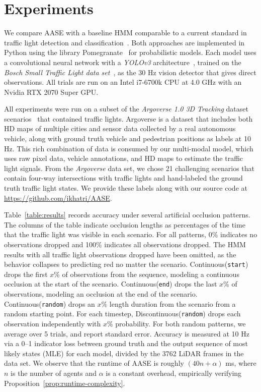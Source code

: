 \documentclass[letterpaper,10pt,conference]{ieeeconf}
\begin{document}
\section{Experiments}

We compare AASE with a baseline HMM comparable to a current standard in traffic light detection and classification~\cite{gomez2014traffic}. Both approaches are implemented in Python using the library Pomegranate~\cite{schreiber2017pomegranate} for probabilistic models. Each model uses a convolutional neural network with a \emph{YOLOv3} architecture~\cite{yolov3}, trained on the \emph{Bosch Small Traffic Light data set}~\cite{behrendt2017deep}, as the 30 Hz vision detector that gives direct observations.  All trials are run on an Intel i7-6700k CPU at 4.0 GHz with an Nvidia RTX 2070 Super GPU. 

All experiments were run on a subset of the \emph{Argoverse 1.0 3D Tracking} dataset scenarios~\cite{chang2019tracking} that contained traffic lights. Argoverse is a dataset that includes both HD maps of multiple cities and sensor data collected by a real autonomous vehicle, along with ground truth vehicle and pedestrian positions as labels at 10 Hz. This rich combination of data is consumed by our multi-modal model, which uses raw pixel data, vehicle annotations, and HD maps to estimate the traffic light signals. From the \emph{Argoverse} data set, we chose 21 challenging scenarios that contain four-way intersections with traffic lights and hand-labeled the ground truth traffic light states. We provide these labels along with our source code at {\small \url{https://github.com/ikhatri/AASE}}.

Table~\ref{table:results} records accuracy under several artificial occlusion patterns. The columns of the table indicate occlusion lengths as percentages of the time that the traffic light was visible in each scenario. For all patterns, 0\% indicates no observations dropped and 100\% indicates all observations dropped. The HMM results with all traffic light observations dropped have been omitted, as the behavior collapses to predicting red no matter the scenario. Continuous(\texttt{start}) drops the first $x$\% of observations from the sequence, modeling a continuous occlusion at the start of the scenario. Continuous(\texttt{end}) drops the last $x$\% of observations, modeling an occlusion at the end of the scenario. Continuous(\texttt{random}) drops an $x\%$ length duration from the scenario from a random starting point. For each timestep, Discontinuous(\texttt{random}) drops each observation independently with $x\%$ probability. For both random patterns, we average over 5 trials, and report standard error. Accuracy is measured at 10 Hz via a 0--1 indicator loss between ground truth and the output sequence of most likely states (MLE) for each model, divided by the 3762 LiDAR frames in the data set. We observe that the runtime of AASE is roughly $(40 n + \alpha)$ ms, where $n$ is the number of agents and $\alpha$ is a constant overhead, empirically verifying Proposition~\ref{prop:runtime-complexity}.
\end{document}
